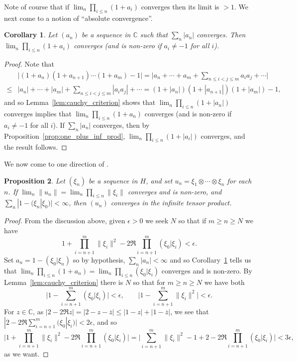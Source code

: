 \documentclass[twoside,a4paper,12pt]{article}
\theoremstyle{plain}
\newtheorem{proposition}{Proposition}[section]
\newtheorem{corollary}[proposition]{Corollary}
\theoremstyle{definition}
\begin{document}
Note of course that if $\lim_n \prod_{i\leq n} (1+a_i)$ converges then its limit is $>1$.  We next come to a notion of ``absolute convergence''.

\begin{corollary}\label{corr:necc_inf_prod_condition}
Let $(a_n)$ be a sequence in $\mathbb C$ such that $\sum_n |a_n|$ converges.  Then $\lim_n \prod_{i\leq n} (1 + a_i)$ converges (and is non-zero if $a_i\not=-1$ for all $i$).
\end{corollary}
\begin{proof}
Note that
\begin{align*}
& \big| (1+a_n)(1+a_{n+1})\cdots(1+a_m) - 1\big|
= \big| a_n+\cdots+a_m + \sum_{n\leq i<j\leq m} a_ia_j + \cdots \big| \\
\leq & |a_n| + \cdots + |a_m| + \sum_{n\leq i<j\leq m} |a_ia_j| + \cdots
= (1+|a_n|)(1+|a_{n+1}|)(1+|a_m|) - 1,
\end{align*}
and so Lemma~\ref{lem:cauchy_criterion} shows that $\lim_n \prod_{i\leq n} (1+|a_n|)$ converges implies that $\lim_n \prod_{i\leq n} (1+a_n)$ converges (and is non-zero if $a_i\not=-1$ for all $i$).  If $\sum_n |a_n|$ converges, then by Proposition~\ref{prop:one_plus_inf_prod}, $\lim_n \prod_{i\leq n} (1+|a_i|)$ converges, and the result follows.
\end{proof}

We now come to one direction of \cite[Lemma~XIV.1.7]{tak3}.

\begin{proposition}
Let $(\xi_n)$ be a sequence in $H$, and set $u_n = \xi_1 \otimes\cdots\otimes \xi_n$ for each $n$.  If $\lim_n \|u_n\| = \lim_n \prod_{i\leq n} \|\xi_i\|$ converges and is non-zero, and $\sum_n |1-(\xi_n|\xi_0)| < \infty$, then $(u_n)$ converges in the infinite tensor product.
\end{proposition}
\begin{proof}
From the discussion above, given $\epsilon>0$ we seek $N$ so that if $m\geq n\geq N$ we have
\[ 1 + \prod_{i={n+1}}^m \|\xi_i\|^2 - 2\Re \prod_{i={n+1}}^m (\xi_0|\xi_i) < \epsilon. \]
Set $a_n = 1-(\xi_0|\xi_n)$ so by hypothesis, $\sum_n |a_n|<\infty$ and so Corollary~\ref{corr:necc_inf_prod_condition} tells us that $\lim_n \prod_{i\leq n} (1+a_n) = \lim_n \prod_{i\leq n} (\xi_0|\xi_i)$ converges and is non-zero.  By Lemma~\ref{lem:cauchy_criterion} there is $N$ so that for $m\geq n\geq N$ we have both
\[ \Big| 1 - \sum_{i=n+1}^m (\xi_0|\xi_i) \Big| < \epsilon, \qquad
\Big| 1 - \sum_{i=n+1}^m \|\xi_i\|^2 \Big| < \epsilon. \]
For $z\in\mathbb C$, as $|2-2\Re z| = |2-z-\overline{z}| \leq |1-z| + |1-\overline{z}|$, we see that $| 2 - 2\Re \sum_{i=n+1}^m (\xi_0|\xi_i)| < 2\epsilon$, and so
\[ \Big|1 + \prod_{i={n+1}}^m \|\xi_i\|^2 - 2\Re \prod_{i={n+1}}^m (\xi_0|\xi_i) \Big|
= \Big| \sum_{i=n+1}^m \|\xi_i\|^2 -1 + 2 - 2\Re \prod_{i={n+1}}^m (\xi_0|\xi_i) \Big|
< 3\epsilon, \]
as we want.
\end{proof}
\end{document}

